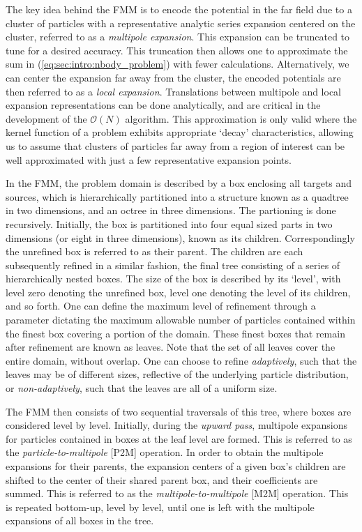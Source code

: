 \documentclass{IEEEcsmag}
\begin{document}
The key idea behind the FMM is to encode the potential in the far field due to a cluster of particles with a representative analytic series expansion centered on the cluster, referred to as a \textit{multipole expansion}. This expansion can be truncated to tune for a desired accuracy. This truncation then allows one to approximate the sum in (\ref{eq:sec:intro:nbody_problem}) with fewer calculations. Alternatively, we can center the expansion far away from the cluster, the encoded potentials are then referred to as a \textit{local expansion}. Translations between multipole and local expansion representations can be done analytically, and are critical in the development of the $\mathcal{O}(N)$ algorithm. This approximation is only valid where the kernel function of a problem exhibits appropriate `decay' characteristics, allowing us to assume that clusters of particles far away from a region of interest can be well approximated with just a few representative expansion points.

In the FMM, the problem domain is described by a box enclosing all targets and sources, which is hierarchically partitioned into a structure known as a quadtree in two dimensions, and an octree in three dimensions. The partioning is done recursively. Initially, the box is partitioned into four equal sized parts in two dimensions (or eight in three dimensions), known as its children. Correspondingly the unrefined box is referred to as their parent. The children are each subsequently refined in a similar fashion, the final tree consisting of a series of hierarchically nested boxes. The size of the box is described by its `level', with level zero denoting the unrefined box, level one denoting the level of its children, and so forth. One can define the maximum level of refinement through a parameter dictating the maximum allowable number of particles contained within the finest box covering a portion of the domain. These finest boxes that remain after refinement are known as leaves. Note that the set of all leaves cover the entire domain, without overlap. One can choose to refine \textit{adaptively}, such that the leaves may be of different sizes, reflective of the underlying particle distribution, or \textit{non-adaptively}, such that the leaves are all of a uniform size.

The FMM then consists of two sequential traversals of this tree, where boxes are considered level by level. Initially, during the \textit{upward pass}, multipole expansions for particles contained in boxes at the leaf level are formed. This is referred to as the \textit{particle-to-multipole} [P2M] operation. In order to obtain the multipole expansions for their parents, the expansion centers of a given box's children are shifted to the center of their shared parent box, and their coefficients are summed. This is referred to as the \textit{multipole-to-multipole} [M2M] operation. This is repeated bottom-up, level by level, until one is left with the multipole expansions of all boxes in the tree.
\end{document}
